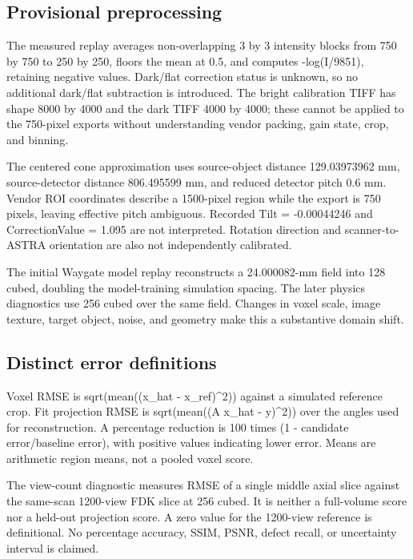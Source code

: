 \documentclass[conference,a4paper]{IEEEtran}
\begin{document}
\subsection{Provisional preprocessing}

The measured replay averages non-overlapping 3 by 3 intensity blocks from 750 by 750 to 250 by 250, floors the mean at 0.5, and computes -log(I/9851), retaining negative values. Dark/flat correction status is unknown, so no additional dark/flat subtraction is introduced. The bright calibration TIFF has shape 8000 by 4000 and the dark TIFF 4000 by 4000; these cannot be applied to the 750-pixel exports without understanding vendor packing, gain state, crop, and binning.

The centered cone approximation uses source-object distance 129.03973962 mm, source-detector distance 806.495599 mm, and reduced detector pitch 0.6 mm. Vendor ROI coordinates describe a 1500-pixel region while the export is 750 pixels, leaving effective pitch ambiguous. Recorded Tilt = -0.00044246 and CorrectionValue = 1.095 are not interpreted. Rotation direction and scanner-to-ASTRA orientation are also not independently calibrated.

The initial Waygate model replay reconstructs a 24.000082-mm field into 128 cubed, doubling the model-training simulation spacing. The later physics diagnostics use 256 cubed over the same field. Changes in voxel scale, image texture, target object, noise, and geometry make this a substantive domain shift.

\subsection{Distinct error definitions}

Voxel RMSE is sqrt(mean((x\_hat - x\_ref)\textasciicircum{}2)) against a simulated reference crop. Fit projection RMSE is sqrt(mean((A x\_hat - y)\textasciicircum{}2)) over the angles used for reconstruction. A percentage reduction is 100 times (1 - candidate error/baseline error), with positive values indicating lower error. Means are arithmetic region means, not a pooled voxel score.

The view-count diagnostic measures RMSE of a single middle axial slice against the same-scan 1200-view FDK slice at 256 cubed. It is neither a full-volume score nor a held-out projection score. A zero value for the 1200-view reference is definitional. No percentage accuracy, SSIM, PSNR, defect recall, or uncertainty interval is claimed.
\end{document}
